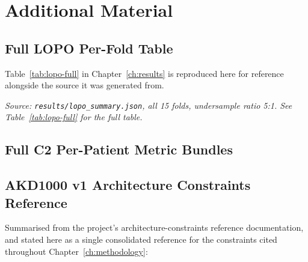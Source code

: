 \chapter{Additional Material}
\label{ch:appendix}

\section{Full LOPO Per-Fold Table}

Table~\ref{tab:lopo-full} in Chapter~\ref{ch:results} is reproduced here for reference alongside the source it was generated from.

\begin{center}
\textit{Source: \texttt{results/lopo\_summary.json}, all 15 folds, undersample ratio 5:1. See Table~\ref{tab:lopo-full} for the full table.}
\end{center}

\section{Full C2 Per-Patient Metric Bundles}



\section{AKD1000 v1 Architecture Constraints Reference}

Summarised from the project's architecture-constraints reference documentation, and stated here as a single consolidated reference for the constraints cited throughout Chapter~\ref{ch:methodology}:

